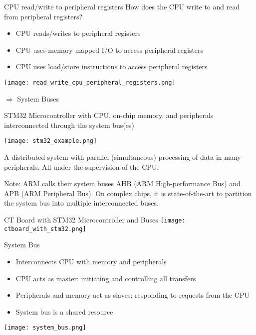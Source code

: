 \begin{concept}{CPU read/write to peripheral registers}
    How does the CPU write to and read from peripheral registers?
    \begin{itemize}
        \item CPU reads/writes to peripheral registers
        \item CPU uses memory-mapped I/O to access peripheral registers
        \item CPU uses load/store instructions to access peripheral registers
    \end{itemize}
    \texttt{[image: read\_write\_cpu\_peripheral\_registers.png]}

    $\Rightarrow$ System Buses
\end{concept}

\begin{example2}{STM32 Microcontroller}
    with CPU, on-chip memory, and peripherals interconnected through the system bus(es)

    \texttt{[image: stm32\_example.png]}

    A distributed system with parallel (simultaneous) processing of data in many peripherals. All under the supervision of the CPU.
\end{example2}

\begin{remark}
    Note: ARM calls their system buses AHB (ARM High-performance Bus) and APB (ARM
    Peripheral Bus). On complex chips, it is state-of-the-art to partition the system bus into
    multiple interconnected buses.
\end{remark}

\begin{example2}{CT Board with STM32 Microcontroller and Buses}
    \texttt{[image: ctboard\_with\_stm32.png]}
\end{example2}

\begin{definition}{System Bus}
    \begin{itemize}
        \item Interconnects CPU with memory and peripherals
        \item CPU acts as master: initiating and controlling all transfers
        \item Peripherals and memory act as slaves: responding to requests from the CPU
        \item System bus is a shared resource
    \end{itemize}
    \texttt{[image: system\_bus.png]}
\end{definition}


